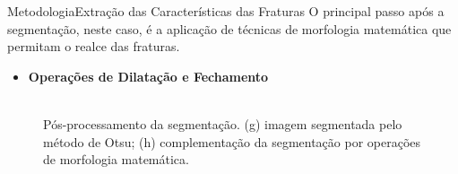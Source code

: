 \documentclass{beamer}
\begin{document}
\begin{frame}{Metodologia}{Extração das Características das Fraturas}
    O principal passo após a segmentação, neste caso, é a aplicação de técnicas de morfologia matemática que permitam o realce das fraturas.
    \begin{itemize}
        \item \textbf{Operações de Dilatação e Fechamento}
    \end{itemize}
    
    \begin{figure}[!htb]
        \centering
         \hspace*{0.2cm}
        \\
        \scriptsize{Pós-processamento da segmentação. (g) imagem segmentada pelo método de Otsu; (h) complementação da segmentação por operações de morfologia matemática.}
    \end{figure}
\end{frame}
\end{document}
